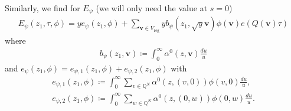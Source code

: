 \documentclass[twoside,a4paper,10pt]{article} %
\newcommand{\8}{\infty}
\newcommand{\vbf}{\mathbf{v}}
\newcommand{\A}{\mathbb{A}}
\newcommand{\Q}{\mathbb{Q}}
\newcommand{\reg}{\mathrm{reg}}
\newcommand{\Scal}{\pazocal{S}}
\newcommand\restr[2]{{%
  \left.\kern-\nulldelimiterspace %
  #1 %
  \vphantom{\big|} %
  \right|_{#2} %
  }}
\theoremstyle{mytheoremstyle}
\newtheorem{lem}[thm]{Lemma}
\theoremstyle{remark}
\numberwithin{equation}{section}
\begin{document}
Similarly, we find for $E_\psi$ (we will only need the value at $s=0$)
\begin{align} \label{fourier Epsi}
E_\psi(z_1,\tau,\phi)=ye_\psi(z_1,\phi)+\sum_{\vbf \in V_\reg} y b_\psi(z_1,\sqrt{y}\vbf) \phi(\vbf) e(Q(\vbf)\tau)
\end{align}
where
\begin{align}
b_\psi(z_1,\vbf) \coloneqq \int_0^\8 \alpha^0(z,\vbf) \frac{du}{u}
\end{align}
and $e_\psi(z_1,\phi)=e_{\psi,1}(z_1,\phi)+e_{\psi,2}(z_1,\phi)$ with
\begin{align}
e_{\psi,1}(z_1,\phi) \coloneqq \int_0^\8 \sum_{v \in \Q^N}\alpha^0(z,(v,0))\phi(v,0) \frac{du}{u}, \\
e_{\psi,2}(z_1,\phi) \coloneqq \int_0^\8 \sum_{w \in \Q^N}\alpha^0(z,(0,w))\phi(0,w) \frac{du}{u}.
\end{align}
%
%
%
\end{document}
